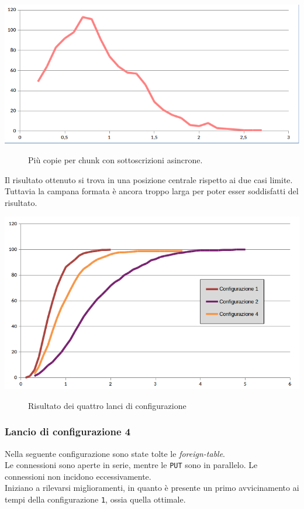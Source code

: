\begin{center}
\includegraphics[scale=0.70]{img/round1.png}
\end{center}
\begin{figure}[htbp]
\caption{Pi\`{u} copie per chunk con sottoscrizioni asincrone. \label{figura1.15}}
\end{figure}

Il risultato ottenuto si trova in una posizione centrale rispetto ai due casi limite. Tuttavia la campana formata \`{e} ancora troppo larga per poter esser soddisfatti del risultato.

\begin{center}
\includegraphics[scale=0.70]{img/comparison2.png}
\end{center}
\begin{figure}[htbp]
\caption{Risultato dei quattro lanci di configurazione \label{figura1.15}}
\end{figure}

\item
\subsubsection{Lancio di configurazione 4} 
Nella seguente configurazione sono state tolte le \textit{foreign-table}.\\
Le connessioni sono aperte in serie, mentre le \verb"PUT" sono in parallelo. Le connessioni non incidono eccessivamente.\\
Iniziano a rilevarsi miglioramenti, in quanto \`{e} presente un primo avvicinamento ai tempi della configurazione \verb"1", ossia quella ottimale.

